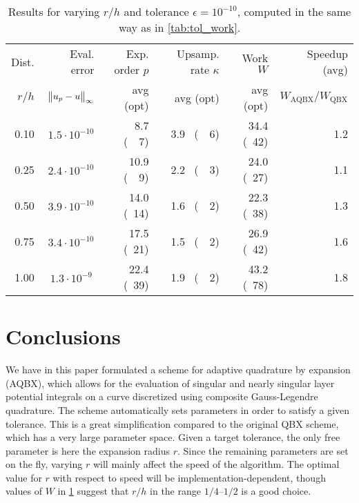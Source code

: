 \documentclass[hidelinks]{siamart1116}
\begin{document}
\begin{table}[htbp]
  
  \centering
  \begin{tabular}{r|r|r|r|r|r}
    \hline
    Dist. & Eval. error & Exp. order $p$ & Upsamp. rate ${\kappa}$ & Work ${{W}}$ &Speedup (avg)\\
    $r/h$ & $\norm{u_p - u}_{\infty}$ & avg (opt) & avg (opt) & avg (opt) & ${{W}}_{\text{AQBX}} / {{W}}_{\text{QBX}}$  \\
    \hline
    0.10 &  $1.5\cdot 10^{-10}$   &   ~8.7  (~~7)  &  3.9~  (~~6) & 34.4 (~42) &  1.2  \\
    0.25 &  $2.4\cdot 10^{-10}$   &   10.9  (~~9)  &  2.2~  (~~3) & 24.0 (~27) &  1.1 \\
    0.50 &  $3.9\cdot 10^{-10}$   &   14.0  (~14)  &  1.6~  (~~2) & 22.3 (~38) &  1.3 \\
    0.75 &  $3.4\cdot 10^{-10}$   &   17.5  (~21)  &  1.5~  (~~2) & 26.9 (~42) &  1.6 \\
    1.00 &  $1.3\cdot 10^{-9~}$   &   22.4  (~39)  &  1.9~  (~~2) & 43.2 (~78) &  1.8 \\
    \hline  
  \end{tabular}
  \caption{Results for varying $r/h$ and tolerance ${\epsilon}=10^{-10}$, computed in the same way as in \cref{tab:tol_work}.}
  \label{tab:rh_work}
\end{table}

\section{Conclusions}

We have in this paper formulated a scheme for adaptive quadrature by
expansion (AQBX), which allows for the evaluation of singular and
nearly singular layer potential integrals on a curve discretized using
composite Gauss-Legendre quadrature. The scheme automatically sets
parameters in order to satisfy a given tolerance. This is a great
simplification compared to the original QBX scheme, which has a very
large parameter space. Given a target tolerance, the only free
parameter is here the expansion radius $r$. Since the remaining
parameters are set on the fly, varying $r$ will mainly affect the
speed of the algorithm. The optimal value for $r$ with respect to
speed will be implementation-dependent, though values of $W$ in
\cref{tab:rh_work} suggest that $r/h$ in the range $1/4$--$1/2$ is a
good choice.
\end{document}
